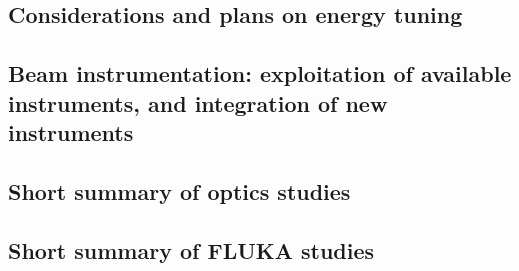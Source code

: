 \documentclass{cernatsnote}
\begin{document}
    \subsection{Considerations and plans on energy tuning}
           
    
    \subsection{Beam instrumentation: exploitation of available instruments, and integration of new instruments}
         
    
    \subsection{Short summary of optics studies}
         

    \subsection{Short summary of FLUKA studies}
         
        
    \pagebreak
    


\end{document}
